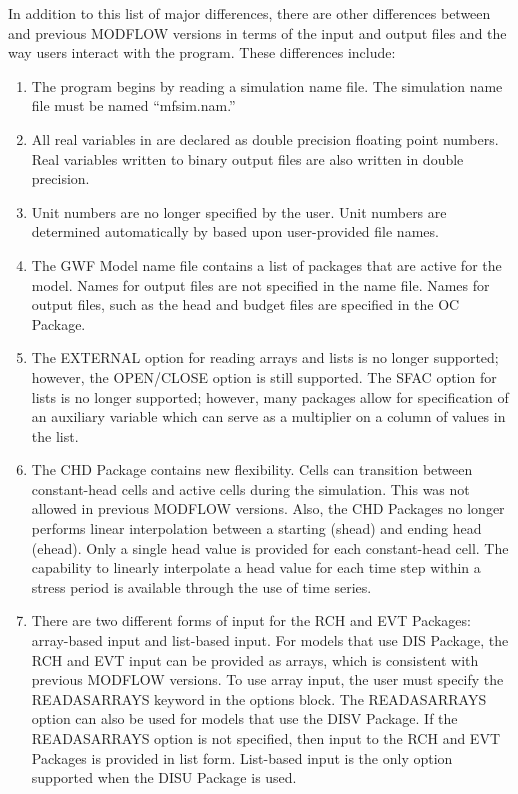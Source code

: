 In addition to this list of major differences, there are other differences between \mf and previous MODFLOW versions in terms of the input and output files and the way users interact with the program.  These differences include:

\begin{enumerate}

\item The \mf program begins by reading a simulation name file.  The simulation name file must be named ``mfsim.nam.''

\item All real variables in \mf are declared as double precision floating point numbers.  Real variables written to binary output files are also written in double precision.

\item Unit numbers are no longer specified by the user.  Unit numbers are determined automatically by \mf based upon user-provided file names.

\item The GWF Model name file contains a list of packages that are active for the model.  Names for output files are not specified in the name file.  Names for output files, such as the head and budget files are specified in the OC Package.

\item The EXTERNAL option for reading arrays and lists is no longer supported; however, the OPEN/CLOSE option is still supported.  The SFAC option for lists is no longer supported; however, many packages allow for specification of an auxiliary variable which can serve as a multiplier on a column of values in the list.

\item The CHD Package contains new flexibility.  Cells can transition between constant-head cells and active cells during the simulation.  This was not allowed in previous MODFLOW versions.  Also, the CHD Packages no longer performs linear interpolation between a starting (shead) and ending head (ehead).  Only a single head value is provided for each constant-head cell.  The capability to linearly interpolate a head value for each time step within a stress period is available through the use of time series.

\item There are two different forms of input for the RCH and EVT Packages: array-based input and list-based input.  For models that use DIS Package, the RCH and EVT input can be provided as arrays, which is consistent with previous MODFLOW versions.  To use array input, the user must specify the READASARRAYS keyword in the options block.  The READASARRAYS option can also be used for models that use the DISV Package.  If the READASARRAYS option is not specified, then input to the RCH and EVT Packages is provided in list form.  List-based input is the only option supported when the DISU Package is used.


\end{enumerate}
